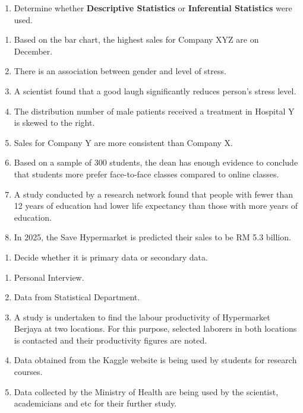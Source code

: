 \documentclass[
  a4paper,
  DIV=11,
  numbers=noendperiod,
  oneside]{scrreprt}
\providecommand{\tightlist}{%
  \setlength{\itemsep}{0pt}\setlength{\parskip}{0pt}}\usepackage{longtable,booktabs,array}
\begin{document}
\begin{enumerate}
\def\labelenumi{\arabic{enumi}.}
\setcounter{enumi}{3}
\tightlist
\item
  Determine whether \textbf{Descriptive Statistics} or
  \textbf{Inferential Statistics} were used.
\end{enumerate}

\begin{enumerate}
\def\labelenumi{\alph{enumi})}
\tightlist
\item
  Based on the bar chart, the highest sales for Company XYZ are on
  December.
\item
  There is an association between gender and level of stress.
\item
  A scientist found that a good laugh significantly reduces person's
  stress level.
\item
  The distribution number of male patients received a treatment in
  Hospital Y is skewed to the right.
\item
  Sales for Company Y are more consistent than Company X.
\item
  Based on a sample of 300 students, the dean has enough evidence to
  conclude that students more prefer face-to-face classes compared to
  online classes.
\item
  A study conducted by a research network found that people with fewer
  than 12 years of education had lower life expectancy than those with
  more years of education.
\item
  In 2025, the Save Hypermarket is predicted their sales to be RM 5.3
  billion.
\end{enumerate}

\begin{enumerate}
\def\labelenumi{\arabic{enumi}.}
\setcounter{enumi}{4}
\tightlist
\item
  Decide whether it is primary data or secondary data.
\end{enumerate}

\begin{enumerate}
\def\labelenumi{\alph{enumi})}
\tightlist
\item
  Personal Interview.
\item
  Data from Statistical Department.
\item
  A study is undertaken to find the labour productivity of Hypermarket
  Berjaya at two locations. For this purpose, selected laborers in both
  locations is contacted and their productivity figures are noted.
\item
  Data obtained from the Kaggle website is being used by students for
  research courses.
\item
  Data collected by the Ministry of Health are being used by the
  scientist, academicians and etc for their further study.
\end{enumerate}
\end{document}
